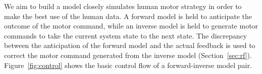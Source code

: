 



We aim to build a model closely simulates human motor strategy in order to make the best use of the human data. A forward model is held to anticipate the outcome of the motor command, while an inverse model is held to generate motor commands to take the current system state to the next state. The discrepancy between the anticipation of the forward model and the actual feedback is used to correct the motor command generated from the inverse model (Section~\ref{sec:rf}). Figure~\ref{fig:control} shows the basic control flow of a forward-inverse model pair.

